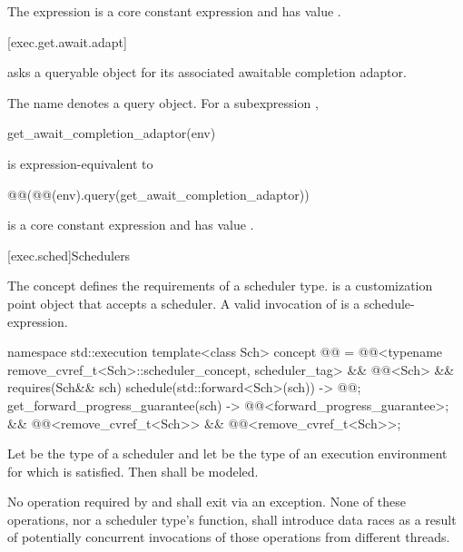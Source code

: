 The expression
is a core constant expression and has value .

[exec.get.await.adapt]{}

\pnum
{} asks a queryable object for
its associated awaitable completion adaptor.

\pnum
The name  denotes a query object.
For a subexpression ,
\begin{codeblock}
get_await_completion_adaptor(env)
\end{codeblock}
is expression-equivalent to
\begin{codeblock}
@@(@@(env).query(get_await_completion_adaptor))
\end{codeblock}

\pnum
{}
is a core constant expression and has value .

[exec.sched]{Schedulers}

\pnum
The  concept defines
the requirements of a scheduler type.
 is a customization point object
that accepts a scheduler.
A valid invocation of  is a schedule-expression.
\begin{codeblock}
namespace std::execution {
  template<class Sch>
    concept @@ =
      @@<typename remove_cvref_t<Sch>::scheduler_concept, scheduler_tag> &&
      @@<Sch> &&
      requires(Sch&& sch) {
        { schedule(std::forward<Sch>(sch)) } -> @@;
        { get_forward_progress_guarantee(sch) } -> @@<forward_progress_guarantee>;
      } &&
      @@<remove_cvref_t<Sch>> &&
      @@<remove_cvref_t<Sch>>;
}
\end{codeblock}

\pnum
Let  be the type of a scheduler and
let  be the type of an execution environment
for which 
is satisfied.
Then 
shall be modeled.

\pnum
No operation required by
 and
shall exit via an exception.
None of these operations,
nor a scheduler type's  function,
shall introduce data races
as a result of potentially concurrent invocations
of those operations from different threads.


